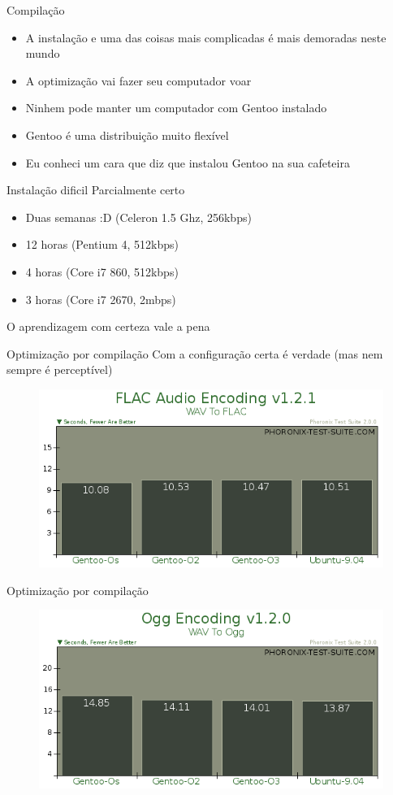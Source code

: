 \documentclass{beamer}
\begin{document}
\begin{frame}{Compilação}
\begin{itemize}
\item A instalação e uma das coisas mais complicadas é mais demoradas neste mundo
\item A optimização vai fazer seu computador voar
\item Ninhem pode manter um computador com Gentoo instalado
\item Gentoo é uma distribuição muito flexível
\item Eu conheci um cara que diz que instalou Gentoo na sua cafeteira
\end{itemize}
\end{frame}


\begin{frame}{Instalação dificil}
Parcialmente certo
\begin{itemize}
\item Duas semanas :D (Celeron 1.5 Ghz, 256kbps)
\item 12 horas (Pentium 4, 512kbps)
\item 4 horas (Core i7 860, 512kbps)
\item 3 horas (Core i7 2670, 2mbps)
\end{itemize}
O aprendizagem com certeza vale a pena
\end{frame}

\begin{frame}{Optimização por compilação}
Com a configuração certa é verdade (mas nem sempre é perceptível)
\begin{figure}[tbph]
\centering
\includegraphics[width=0.7\linewidth]{./flacgentoo}
\label{fig:flacgentoo}
\end{figure}
\end{frame}


\begin{frame}{Optimização por compilação}
\begin{figure}[tbph]
\centering
\includegraphics[width=0.7\linewidth]{./ogggentoo}
\label{fig:ogggentoo}
\end{figure}
\end{frame}
\end{document}
